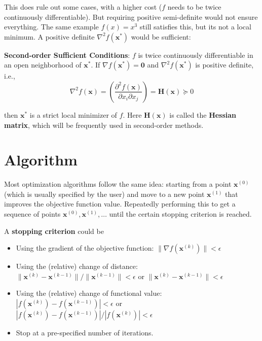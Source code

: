 \documentclass[
]{book}
\providecommand{\tightlist}{%
  \setlength{\itemsep}{0pt}\setlength{\parskip}{0pt}}
\theoremstyle{definition}
\theoremstyle{definition}
\theoremstyle{definition}
\theoremstyle{definition}
\theoremstyle{remark}
\begin{document}
This does rule out some cases, with a higher cost (\(f\) needs to be twice continuously differentiable). But requiring positive semi-definite would not ensure everything. The same example \(f(x) = x^3\) still satisfies this, but its not a local minimum. A positive definite \(\nabla^2 f(\mathbf{x}^\ast)\) would be sufficient:

\textbf{Second-order Sufficient Conditions}: \(f\) is twice continuously differentiable in an open neighborhood of \(\mathbf{x}^\ast\). If \(\nabla f(\mathbf{x}^\ast) = \mathbf{0}\) and \(\nabla^2 f(\mathbf{x}^\ast)\) is positive definite, i.e.,
\[
\nabla^2 f(\mathbf{x}) = \left(\frac{\partial^2 f(\mathbf{x})}{\partial x_i \partial x_j}\right) = \mathbf{H}(\mathbf{x}) \succeq 0
\]

then \(\mathbf{x}^\ast\) is a strict local minimizer of \(f\). Here \(\mathbf{H}(\mathbf{x})\) is called the \textbf{Hessian matrix}, which will be frequently used in second-order methods.

\hypertarget{algorithm}{%
\section{Algorithm}\label{algorithm}}

Most optimization algorithms follow the same idea: starting from a point \(\mathbf{x}^{(0)}\) (which is usually specified by the user) and move to a new point \(\mathbf{x}^{(1)}\) that improves the objective function value. Repeatedly performing this to get a sequence of points \(\mathbf{x}^{(0)}, \mathbf{x}^{(1)}, \ldots\) until the certain stopping criterion is reached.

A \textbf{stopping criterion} could be

\begin{itemize}
\tightlist
\item
  Using the gradient of the objective function: \(\lVert \nabla f(\mathbf{x}^{(k)}) \rVert < \epsilon\)
\item
  Using the (relative) change of distance: \(\lVert \mathbf{x}^{(k)} - \mathbf{x}^{(k-1)} \rVert / \lVert \mathbf{x}^{(k-1)}\rVert< \epsilon\) or \(\lVert \mathbf{x}^{(k)} - \mathbf{x}^{(k-1)} \rVert < \epsilon\)
\item
  Using the (relative) change of functional value: \(| f(\mathbf{x}^{(k)}) - f(\mathbf{x}^{(k-1)})| < \epsilon\) or \(| f(\mathbf{x}^{(k)}) - f(\mathbf{x}^{(k-1)})| / |f(\mathbf{x}^{(k)})| < \epsilon\)
\item
  Stop at a pre-specified number of iterations.
\end{itemize}
\end{document}
